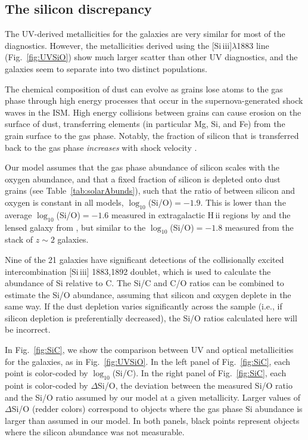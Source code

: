 \documentclass[preprint2]{aastex62}
\newcommand{\hii}{H\,{\sc ii}\xspace}
\newcommand{\SiuIII}{[Si\,{\sc iii}]\xspace}
\begin{document}
\subsection{The silicon discrepancy}

The UV-derived metallicities for the \citet{Berg+2016} galaxies are very similar for most of the diagnostics. However, the metallicities derived using the \SiuIII$\lambda$1883 line (Fig.~\ref{fig:UVSiO}) show much larger scatter than other UV diagnostics, and the \citet{Berg+2016} galaxies seem to separate into two distinct populations.

The chemical composition of dust can evolve as grains lose atoms to the gas phase through high energy processes that occur in the supernova-generated shock waves in the ISM. High energy collisions between grains can cause erosion on the surface of dust, transferring elements (in particular Mg, Si, and Fe) from the grain surface to the gas phase. Notably, the fraction of silicon that is transferred back to the gas phase \emph{increases} with shock velocity \citep[see review on depletion patterns and dust evolution in][]{Jones+2000}.

Our model assumes that the gas phase abundance of silicon scales with the oxygen abundance, and that a fixed fraction of silicon is depleted onto dust grains (see Table~\ref{tab:solarAbunds}), such that the ratio of between silicon and oxygen is constant in all models, $\log_{10}$(Si/O)$=-1.9$. This is lower than the average $\log_{10}$(Si/O)$=-1.6$ measured in extragalactic \hii regions by \citet{Garnett+1995} and the lensed galaxy from \citet{Berg+2018}, but similar to the $\log_{10}$(Si/O)$=-1.8$ measured from the \citet{Steidel+2016} stack of $z\sim2$ galaxies.

Nine of the 21 \citet{Berg+2016} galaxies have significant detections of the collisionally excited intercombination \SiuIII 1883,1892 doublet, which is used to calculate the abundance of Si relative to C. The Si/C and C/O ratios can be combined to estimate the Si/O abundance, assuming that silicon and oxygen deplete in the same way. If the dust depletion varies significantly across the sample (i.e., if silicon depletion is preferentially decreased), the Si/O ratios calculated here will be incorrect.

In Fig.~\ref{fig:SiC}, we show the comparison between UV and optical metallicities for the \citet{Berg+2016} galaxies, as in Fig.~\ref{fig:UVSiO}. In the left panel of Fig.~\ref{fig:SiC}, each point is color-coded by $\log_{10}$(Si/C). In the right panel of Fig.~\ref{fig:SiC}, each point is color-coded by $\Delta$Si/O, the deviation between the measured Si/O ratio and the Si/O ratio assumed by our model at a given metallicity. Larger values of $\Delta$Si/O (redder colors) correspond to objects where the gas phase Si abundance is larger than assumed in our model. In both panels, black points represent objects where the silicon abundance was not measurable. 
\end{document}
